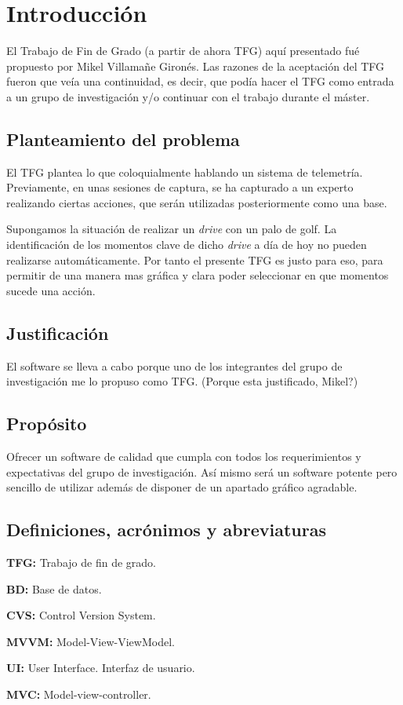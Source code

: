 \chapter{Introducci\'{o}n} 
El Trabajo de Fin de Grado (a partir de ahora TFG) aqu\'{i} presentado fu\'{e} propuesto por Mikel Villama\~{n}e Giron\'{e}s.
Las razones de la aceptaci\'{o}n del TFG fueron que ve\'{i}a una continuidad, es decir, que pod\'{i}a hacer el TFG como entrada
a un grupo de investigaci\'{o}n y/o continuar con el trabajo durante el m\'{a}ster.

\section{Planteamiento del problema}
El TFG plantea lo que coloquialmente hablando un sistema de telemetr\'{i}a. Previamente, en unas sesiones de captura, se ha capturado
a un experto realizando ciertas acciones, que ser\'{a}n utilizadas posteriormente como una base.

Supongamos la situaci\'{o}n de realizar un \emph{drive} con un palo de golf. La identificaci\'{o}n de los momentos clave de dicho \emph{drive}
a d\'{i}a de hoy no pueden realizarse autom\'{a}ticamente. Por tanto el presente TFG es justo para eso, para permitir de una manera
mas gr\'{a}fica y clara poder seleccionar en que momentos sucede una acci\'{o}n.

\section{Justificaci\'{o}n}

El software se lleva a cabo porque uno de los integrantes del grupo de investigaci\'{o}n me lo propuso como TFG. (Porque esta justificado,
Mikel?)

\section{Prop\'{o}sito}
Ofrecer un software de calidad que cumpla con todos los requerimientos y expectativas del grupo de investigaci\'{o}n.
As\'{i} mismo ser\'{a} un software potente pero sencillo de utilizar adem\'{a}s de disponer de un apartado gr\'{a}fico agradable.

\section{Definiciones, acr\'{o}nimos y abreviaturas}
\textbf{TFG:} Trabajo de fin de grado.

\textbf{BD:} Base de datos.

\textbf{CVS:} Control Version System.

\textbf{MVVM:} Model-View-ViewModel.

\textbf{UI:} User Interface. Interfaz de usuario.

\textbf{MVC:} Model-view-controller.
 
